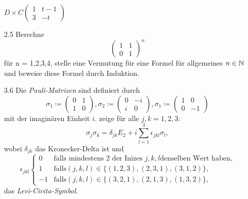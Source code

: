 \documentclass{HM}
\begin{document}
\begin{enumerate}
$D\times C\begin{pmatrix}
	1 & t-1\\
	3 & -t
\end{pmatrix}$
\item [2.5] Berechne
$$\begin{pmatrix}
1 & 1\\
0 & 1
\end{pmatrix}^n$$
für n = 1,2,3,4, stelle eine Vermutung für eine Formel für allgemeines $n\in\mathbb{N}$ und beweise diese Formel durch Induktion.
\item [3.6] Die \textit{Pauli-Matrizen} sind definiert durch
$$\sigma_1 \coloneqq \begin{pmatrix}
0 & 1\\
1 & 0
\end{pmatrix},
\sigma_2 \coloneqq \begin{pmatrix}
0 & -i\\
i & 0
\end{pmatrix},
\sigma_1 \coloneqq \begin{pmatrix}
1 & 0\\
0 & -1
\end{pmatrix}
$$
mit der imaginären Einheit $i$. zeige für alle $j,k = 1,2,3:$\\
$$\sigma_j\sigma_k = \delta_{jk}E_2+i\sum_{l=1}^{3}\epsilon_{jkl}\sigma_l,$$
wobei $\delta_{jk}$ das Kronecker-Delta ist und
$$\epsilon_{jkl}\begin{cases}
0 &\text{falls mindestens 2 der Inizes }j,k,l \text{denselben Wert haben,}\\
1 &\text{falls} (j,k,l)\in\lbrace(1,2,3),(2,3,1),(3,1,2)\rbrace,\\
-1 &\text{falls} (j,k,l)\in\lbrace(3,2,1),(2,1,3),(1,3,2)\rbrace,
\end{cases}$$
das \textit{Levi-Civita-Symbol}.
\end{enumerate}
\end{document}
